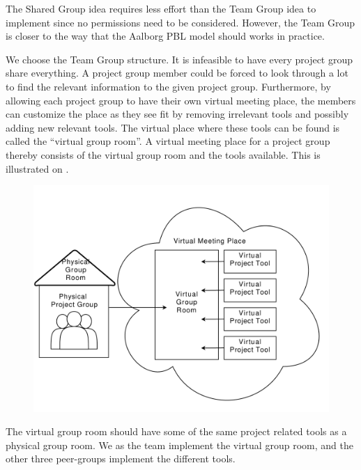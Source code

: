 The Shared Group idea requires less effort than the Team Group idea to implement since no permissions need to be considered.
However, the Team Group is closer to the way that the Aalborg PBL model should works in practice.

We choose the Team Group structure. 
It is infeasible to have every project group share everything.
A project group member could be forced to look through a lot to find the relevant information to the given project group.
Furthermore, by allowing each project group to have their own virtual meeting place, the members can customize the place as they see fit by removing irrelevant tools and possibly adding new relevant tools.
The virtual place where these tools can be found is called the ``virtual group room''.
A virtual meeting place for a project group thereby consists of the virtual group room and the tools available.
This is illustrated on .
\begin{figure}%
\center
\includegraphics[scale=0.50]{images/VirtualMeetingPlace}%
%
\label{fig:projectgrouproom}%
\end{figure}

The virtual group room should have some of the same project related tools as a physical group room.
We as the \administrationgroup{} team implement the virtual group room, and the other three peer-groups implement the different tools.



